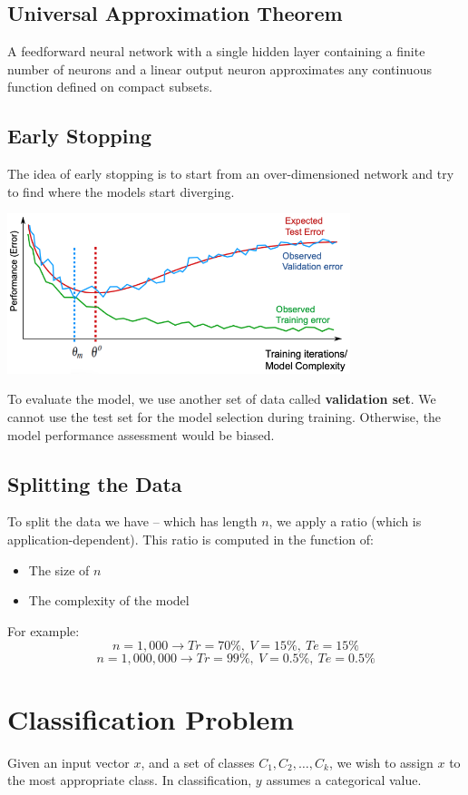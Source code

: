 \documentclass{article}
\begin{document}
\subsection{Universal Approximation Theorem}
A feedforward neural network with a single hidden layer containing a finite number of neurons and a linear output neuron approximates any continuous function defined on compact subsets.

\subsection{Early Stopping}
The idea of early stopping is to start from an over-dimensioned network and try to find where the models start diverging.

\begin{center}
	\includegraphics[width=10cm]{early_stopping.png}
\end{center}
To evaluate the model, we use another set of data called \textbf{validation set}. We cannot use the test set for the model selection during training. Otherwise, the model performance assessment would be biased.

\subsection{Splitting the Data}
To split the data we have -- which has length $n$, we apply a ratio (which is application-dependent). This ratio is computed in the function of:

\begin{itemize}
	\item The size of $n$
	\item The complexity of the model
\end{itemize}
For example:
\[ n = 1,000 \rightarrow Tr = 70\%,~ V = 15\%,~ Te = 15\% \]
\[ n = 1,000,000 \rightarrow Tr = 99\%,~ V = 0.5\%,~ Te = 0.5\% \]

\section{Classification Problem}
Given an input vector $x$, and a set of classes $C_1, C_2, \dots, C_k$, we wish to assign $x$ to the most appropriate class. In classification, $y$ assumes a categorical value.
\end{document}
